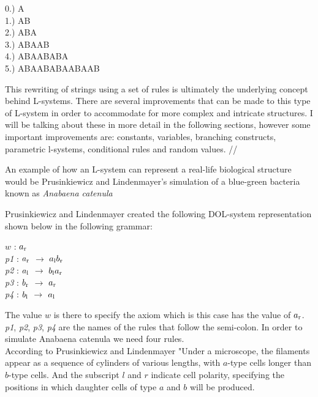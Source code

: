 \begin{flushleft}
\vspace{5mm}

0.) A \\
1.) AB \\
2.) ABA \\
3.) ABAAB \\
4.) ABAABABA \\
5.) ABAABABAABAAB \\

\vspace{5mm}

This rewriting of strings using a set of rules is ultimately the underlying concept behind L-systems. There are several improvements that can be made to this type of L-system in order to accommodate for more complex and intricate structures. I will be talking about these in more detail in the following sections, however some important improvements are: constants, variables, branching constructs, parametric l-systems, conditional rules and random values. //

\vspace{5mm}

An example of how an L-system can represent a real-life biological structure would be Prusinkiewicz and Lindenmayer's simulation of a blue-green bacteria known as \textit{Anabaena catenula}\\

\vspace{5mm}

Prusinkiewicz and Lindenmayer created the following DOL-system representation shown below in the following grammar: \\

\vspace{5mm}

$w$ : $ a\textsubscript{r} $\\
\textit{p1} : $ a\textsubscript{r} $ $\rightarrow$ $a\textsubscript{l}b\textsubscript{r}$ \\
\textit{p2} : $ a\textsubscript{l} $ $\rightarrow$ $b\textsubscript{l}a\textsubscript{r}$ \\
\textit{p3} : $ b\textsubscript{r} $ $\rightarrow$ $a\textsubscript{r}$ \\
\textit{p4} : $ b\textsubscript{l} $ $\rightarrow$ $a\textsubscript{l}$ \\

\vspace{5mm}

The value $w$ is there to specify the axiom which is this case has the value of $ a\textsubscript{r} $. \textit{p1}, \textit{p2}, \textit{p3}, \textit{p4} are the names of the rules that follow the semi-colon. In order to simulate Anabaena catenula we need four rules. \\
According to Prusinkiewicz and Lindenmayer "Under a microscope, the filaments appear as a sequence of cylinders of various lengths, with $a$-type cells longer than $b$-type cells. And the subscript $l$ and $r$ indicate cell polarity, specifying the positions in which daughter cells of type $a$ and $b$ will be produced. \cite{prusinkiewicz2012algorithmic} \\


\end{flushleft}
